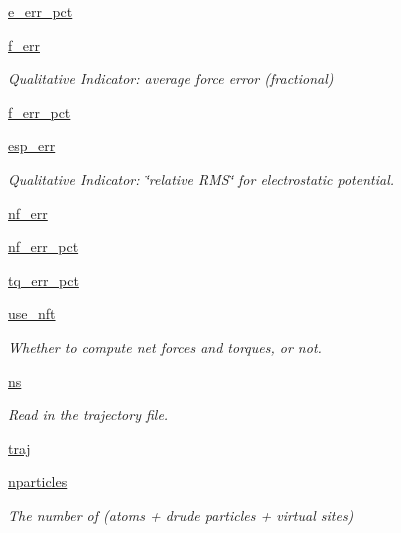 \begin{DoxyCompactItemize}
\hyperlink{classforcebalance_1_1abinitio_1_1AbInitio_a4e3e525a03ab55bc004ebf0e3a0d60ce}{e\-\_\-err\-\_\-pct}
\item 
\hyperlink{classforcebalance_1_1abinitio_1_1AbInitio_a176fb2b013ecc5ab451fd3b190414c4d}{f\-\_\-err}
\begin{DoxyCompactList}\small\item\em Qualitative Indicator\-: average force error (fractional) \end{DoxyCompactList}\item 
\hyperlink{classforcebalance_1_1abinitio_1_1AbInitio_ab6ee932ad4689f538c746310939dd0bc}{f\-\_\-err\-\_\-pct}
\item 
\hyperlink{classforcebalance_1_1abinitio_1_1AbInitio_abdc625c3149cee375b56b4e0d73034fe}{esp\-\_\-err}
\begin{DoxyCompactList}\small\item\em Qualitative Indicator\-: \char`\"{}relative R\-M\-S\char`\"{} for electrostatic potential. \end{DoxyCompactList}\item 
\hyperlink{classforcebalance_1_1abinitio_1_1AbInitio_a89de620e9aa500481c9e1ded99e14f72}{nf\-\_\-err}
\item 
\hyperlink{classforcebalance_1_1abinitio_1_1AbInitio_a184edac2cb27a999c363595ea59d8163}{nf\-\_\-err\-\_\-pct}
\item 
\hyperlink{classforcebalance_1_1abinitio_1_1AbInitio_a184f2a783b2710f6f75842afdeccf14e}{tq\-\_\-err\-\_\-pct}
\item 
\hyperlink{classforcebalance_1_1abinitio_1_1AbInitio_afd8d179560a295ffa6c6309843c59279}{use\-\_\-nft}
\begin{DoxyCompactList}\small\item\em Whether to compute net forces and torques, or not. \end{DoxyCompactList}\item 
\hyperlink{classforcebalance_1_1abinitio_1_1AbInitio_a1e8248e2efe952362b1b21462a70b540}{ns}
\begin{DoxyCompactList}\small\item\em Read in the trajectory file. \end{DoxyCompactList}\item 
\hyperlink{classforcebalance_1_1abinitio_1_1AbInitio_a7b52d5101bfa4fde7129c84c0558ad14}{traj}
\item 
\hyperlink{classforcebalance_1_1abinitio_1_1AbInitio_aef3798e4666b91ecc4c526b679eb4908}{nparticles}
\begin{DoxyCompactList}\small\item\em The number of (atoms + drude particles + virtual sites) \end{DoxyCompactList}\item 

\end{DoxyCompactItemize}
